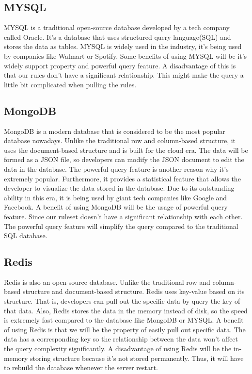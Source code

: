 \documentclass[onecolumn, draftclsnofoot,10pt, compsoc]{IEEEtran}
\begin{document}
\subsection{MYSQL}
MYSQL is a traditional open-source database developed by a tech company called Oracle. It’s a database that uses structured query language(SQL) and stores the data as tables. MYSQL is widely used in the industry, it’s being used by companies like Walmart or Spotify.
Some benefits of using MYSQL will be it's widely support property and powerful query feature. A disadvantage of this is that our rules don’t have a significant relationship. This might make the query a little bit complicated when pulling the rules.\cite{P3T1}

\subsection{MongoDB}
MongoDB is a modern database that is considered to be the most popular database nowadays. Unlike the traditional row and column-based structure, it uses the document-based structure and is built for the cloud era. The data will be formed as a JSON file, so developers can modify the JSON document to edit the data in the database. The powerful query feature is another reason why it’s extremely popular. Furthermore, it provides a statistical feature that allows the developer to visualize the data stored in the database. Due to its outstanding ability in this era, it is being used by giant tech companies like Google and Facebook.
A benefit of using MongoDB will be the usage of powerful query feature. Since our ruleset doesn’t have a significant relationship with each other. The powerful query feature will simplify the query compared to the traditional SQL database.\cite{P3T2}

\subsection{Redis}
Redis is also an open-source database. Unlike the traditional row and column-based structure and document-based structure. Redis uses key-value based on its structure. That is, developers can pull out the specific data by query the key of that data. Also, Redis stores the data in the memory instead of disk, so the speed is extremely fast compared to the database like MongoDB or MYSQL.
A benefit of using Redis is that we will be the property of easily pull out specific data. The data has a corresponding key so the relationship between the data won’t affect the query complexity significantly. A disadvantage of using Redis will be the in-memory storing structure because it’s not stored permanently. Thus, it will have to rebuild the database whenever the server restart.\cite{P3T3}
\end{document}
